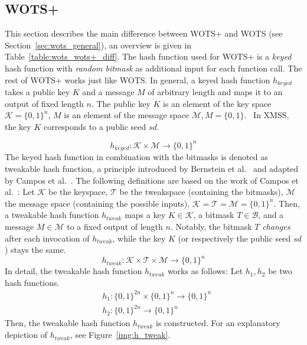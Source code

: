 \subsection{WOTS+}
\label{sec:wots+_general}
This section describes the main difference between WOTS+ and WOTS (see Section~\ref{sec:wots_general}), an overview is given in Table~\ref{table:wots_wots+_diff}. The hash function used for WOTS+ is a \textit{keyed} hash function with \textit{random bitmask} as additional input for each function call. The rest of WOTS+ works just like WOTS.
In general, a keyed hash function $h_{keyed}$ takes a public key $K$ and a message $M$ of arbitrary length and maps it to an output of fixed length $n$. The public key $K$ is an element of the key space~$\mathcal{K}=\{0,1\}^n$, $M$ is an element of the message space $\mathcal{M}, M=\{0,1\}$.~\cite{keyed_hashfct_introduct_2006} In XMSS, the key $K$ corresponds to a public seed $sd$. 

\begin{equation}
\label{eq:keyed_hashfc_general}
h_{keyed}: \mathcal{K} \times \mathcal{M} \rightarrow \{0, 1 \}^n 
\end{equation}
The keyed hash function in combination with the bitmasks is denoted as tweakable hash function, a principle introduced by Bernstein et al.~\cite{tweakable_basispaper_sphincs_2019} and adapted by Campos et al.~\cite{fabio_paper_lms_vs_xmss}. The following definitions are based on the work of Campos et al.~\cite{fabio_paper_lms_vs_xmss}: 
Let $\mathcal{K}$ be the keyspace, $\mathcal{T}$ be the tweakspace (containing the bitmasks), $\mathcal{M}$ the message space (containing the possible inputs), $\mathcal{K}= \mathcal{T}=\mathcal{M}=\{0,1\}^n$.
Then, a tweakable hash function $h_{tweak}$ maps a key $K \in \mathcal{K}$, a bitmask $T \in \mathcal{B}$, and a message $M \in \mathcal{M}$ to a fixed output of length $n$. Notably, the bitmask $T$ \textit{changes} after each invocation of $h_{tweak}$, while the key $K$ (or respectively the public seed $sd$) stays the same.
\begin{equation}
h_{tweak}: \mathcal{K} \times \mathcal{T} \times \mathcal{M} \rightarrow \{0,1\}^n
\end{equation}
In detail, the tweakable hash function $h_{tweak}$ works as follows: Let $h_1, h_2$ be two hash functions. %
\begin{align}
& h_1 : \{0,1\}^{2n} \times \{0,1\}^n \rightarrow \{0,1\}^n \\
& h_2 : \{0,1\}^{2n} \rightarrow \{0,1\}^n 
\end{align}
Then, the tweakable hash function $h_{tweak}$ is constructed. For an explanatory depiction of $h_{tweak}$, see Figure~\ref{img:h_tweak}.

